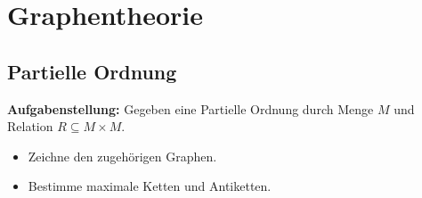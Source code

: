 \section{Graphentheorie}

\subsection{Partielle Ordnung}

\textbf{Aufgabenstellung:} Gegeben eine Partielle Ordnung durch Menge $M$ und Relation $R\subseteq M\times M$.
\begin{itemize}
    \item Zeichne den zugehörigen Graphen.
    \item Bestimme maximale Ketten und Antiketten.
\end{itemize}




